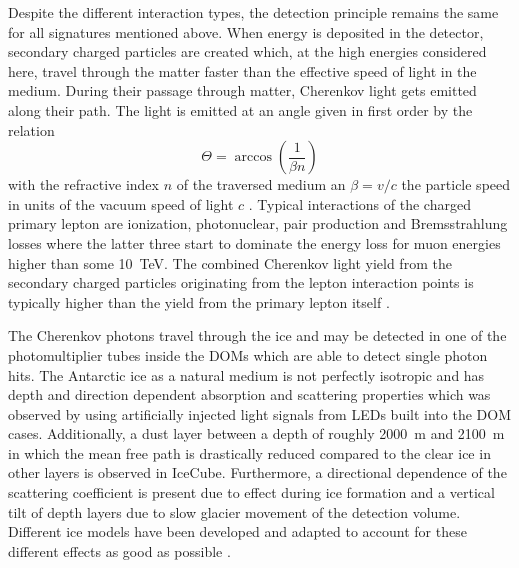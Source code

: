 Despite the different interaction types, the detection principle remains the same for all signatures mentioned above.
When energy is deposited in the detector, secondary charged particles are created which, at the high energies considered here, travel through the matter faster than the effective speed of light in the medium.
During their passage through matter, Cherenkov light gets emitted along their path.
The light is emitted at an angle given in first order by the relation
\begin{equation}
  \Theta = \arccos\left(\frac{1}{\beta n}\right)
\end{equation}
with the refractive index $n$ of the traversed medium an $\beta = v/c$ the particle speed in units of the vacuum speed of light $c$ \cite{Cherenkov:1938origins,Mead:1958QuantRefIdx}.
Typical interactions of the charged primary lepton are ionization, photonuclear, pair production and Bremsstrahlung losses where the latter three start to dominate the energy loss for muon energies higher than some \SI{10}{\tera\eV}.
The combined Cherenkov light yield from the secondary charged particles originating from the lepton interaction points is typically higher than the yield from the primary lepton itself \cite{KOEHNE20132070,RADEL2013102}.

The Cherenkov photons travel through the ice and may be detected in one of the photomultiplier tubes inside the DOMs which are able to detect single photon hits.
The Antarctic ice as a natural medium is not perfectly isotropic and has depth and direction dependent absorption and scattering properties which was observed by using artificially injected light signals from LEDs built into the DOM cases.
Additionally, a dust layer between a depth of roughly \SI{2000}{\m} and \SI{2100}{\m} in which the mean free path is drastically reduced compared to the clear ice in other layers is observed in IceCube.
Furthermore, a directional dependence of the scattering coefficient is present due to effect during ice formation and a vertical tilt of depth layers due to slow glacier movement of the detection volume.
Different ice models have been developed and adapted to account for these different effects as good as possible \cite{Casey:2014SPIce,Bay:2010SPIce,Aartsen:2013rt,Chirkin:2011ice}.

